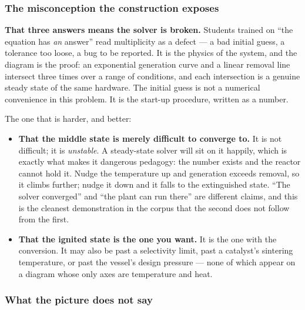 \documentclass[11pt,a4paper]{article}
\begin{document}
\subsubsection*{The misconception the construction exposes}

\begin{pitfall}
\textbf{That three answers means the solver is broken.}  Students trained
on ``the equation has \emph{an} answer'' read multiplicity as a defect ---
a bad initial guess, a tolerance too loose, a bug to be reported.  It is
the physics of the system, and the diagram is the proof: an exponential
generation curve and a linear removal line intersect three times over a
range of conditions, and each intersection is a genuine steady state of
the same hardware.  The initial guess is not a numerical convenience in
this problem.  It is the start-up procedure, written as a number.
\end{pitfall}

The one that is harder, and better:

\begin{itemize}[leftmargin=*,nosep,topsep=4pt]
  \item \textbf{That the middle state is merely difficult to converge
        to.}  It is not difficult; it is \emph{unstable}.  A steady-state
        solver will sit on it happily, which is exactly what makes it
        dangerous pedagogy: the number exists and the reactor cannot hold
        it.  Nudge the temperature up and generation exceeds removal, so
        it climbs further; nudge it down and it falls to the extinguished
        state.  ``The solver converged'' and ``the plant can run there''
        are different claims, and this is the cleanest demonstration in
        the corpus that the second does not follow from the first.
  \item \textbf{That the ignited state is the one you want.}  It is the
        one with the conversion.  It may also be past a selectivity
        limit, past a catalyst's sintering temperature, or past the
        vessel's design pressure --- none of which appear on a diagram
        whose only axes are temperature and heat.
\end{itemize}

\subsubsection*{What the picture does not say}
\end{document}
